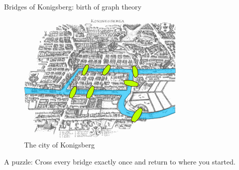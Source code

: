 \documentclass{beamer}
\begin{document}
\begin{frame}{Bridges of Konigsberg: birth of graph theory}


\begin{figure} \includegraphics[width=.6\textwidth]{Pictures/Konigsberg_bridges.png} \caption{The city of Konigsberg}
\end{figure}
\begin{block}{A puzzle:}  Cross every bridge exactly once and return to where you started.
\end{block}
\end{frame}
\end{document}
